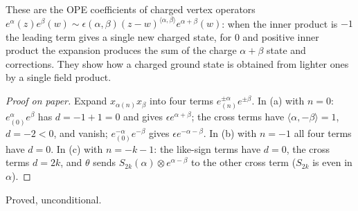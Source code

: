 \begin{physics}
These are the OPE coefficients of charged vertex operators $e^\alpha(z)e^\beta(w)\sim\epsilon(\alpha,\beta)(z-w)^{\langle\alpha,\beta\rangle}e^{\alpha+\beta}(w)$: when the inner product is $-1$ the leading term gives a single new charged state, for $0$ and positive inner product the expansion produces the sum of the charge $\alpha+\beta$ state and corrections. They show how a charged ground state is obtained from lighter ones by a single field product.
\end{physics}
\begin{proof}[Proof on paper]
Expand $x_{\alpha(n)}x_\beta$ into four terms $e^{\pm\alpha}_{(n)}e^{\pm\beta}$.  In (a) with $n=0$:
$e^\alpha_{(0)}e^\beta$ has $d=-1+1=0$ and gives $\epsilon e^{\alpha+\beta}$; the cross terms have
$\langle\alpha,-\beta\rangle=1$, $d=-2<0$, and vanish; $e^{-\alpha}_{(0)}e^{-\beta}$ gives $\epsilon
e^{-\alpha-\beta}$.  In (b) with $n=-1$ all four terms have $d=0$.  In (c) with $n=-k-1$: the like-sign
terms have $d=0$, the cross terms $d=2k$, and $\theta$ sends $S_{2k}(\alpha)\otimes e^{\alpha-\beta}$ to the
other cross term ($S_{2k}$ is even in $\alpha$).
\end{proof}
\begin{status}Proved, unconditional.\end{status}

